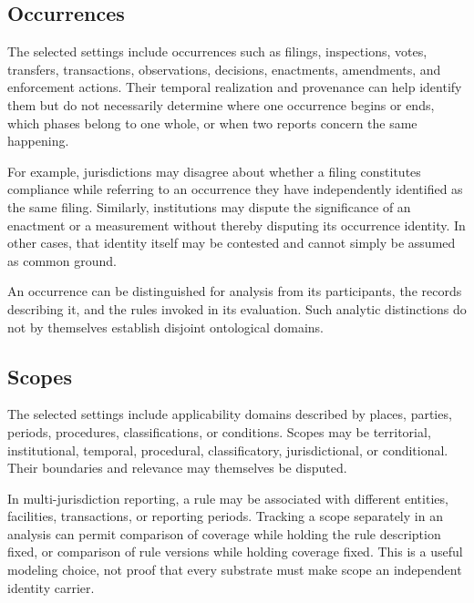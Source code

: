 \subsection{Occurrences}
\label{subsec:inventory_occurrences}

The selected settings include occurrences such as filings, inspections,
votes, transfers, transactions, observations, decisions, enactments,
amendments, and enforcement actions.
Their temporal realization and
provenance can help identify them but do not necessarily determine
where one occurrence begins or ends, which phases belong to one whole,
or when two reports concern the same happening.

For example, jurisdictions may disagree about whether a filing
constitutes compliance while referring to an occurrence they have
independently identified as the same filing.
Similarly, institutions
may dispute the significance of an enactment or a measurement without
thereby disputing its occurrence identity.
In other cases, that identity
itself may be contested and cannot simply be assumed as common ground.

An occurrence can be distinguished for analysis from its participants,
the records describing it, and the rules invoked in its evaluation.
Such analytic distinctions do not by themselves establish disjoint
ontological domains.

\subsection{Scopes}
\label{subsec:inventory_scopes}

The selected settings include applicability domains described by
places, parties, periods, procedures, classifications, or conditions.
Scopes may be territorial, institutional, temporal, procedural,
classificatory, jurisdictional, or conditional.
Their boundaries
and relevance may themselves be disputed.

In multi-jurisdiction reporting, a rule may be associated with
different entities, facilities, transactions, or reporting periods.
Tracking a scope separately in an analysis can permit comparison of
coverage while holding the rule description fixed, or comparison of
rule versions while holding coverage fixed.
This is a useful modeling
choice, not proof that every substrate must make scope an independent
identity carrier.

